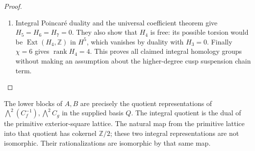 \begin{proof}
\begin{enumerate}[label=\arabic*.]
\item Integral Poincar\'e duality and the universal coefficient theorem
give $H_5=H_6=H_7=0$.  They also show that $H_4$ is free: its possible
torsion would be $\operatorname{Ext}(H_4,\mathbb Z)$ in $H^5$, which
vanishes by duality with $H_3=0$.
Finally $\chi=6$ gives $\operatorname{rank}H_4=4$.
This proves all claimed integral homology groups without making an
assumption about the higher-degree cusp suspension chain term.

\end{enumerate}
\end{proof}

\begin{theorem}\label{night:P1.2}
The lower blocks of $A,B$ are precisely the quotient representations of
$\bigwedge^2(C_f^{-1}),\bigwedge^2C_g$ in the supplied basis $Q$.
The integral quotient is the dual of the primitive exterior-square
lattice.  The natural map from the primitive lattice into that quotient
has cokernel $\mathbb Z/2$; these two integral representations are not
isomorphic.  Their rationalizations are isomorphic by that same map.
\end{theorem}
